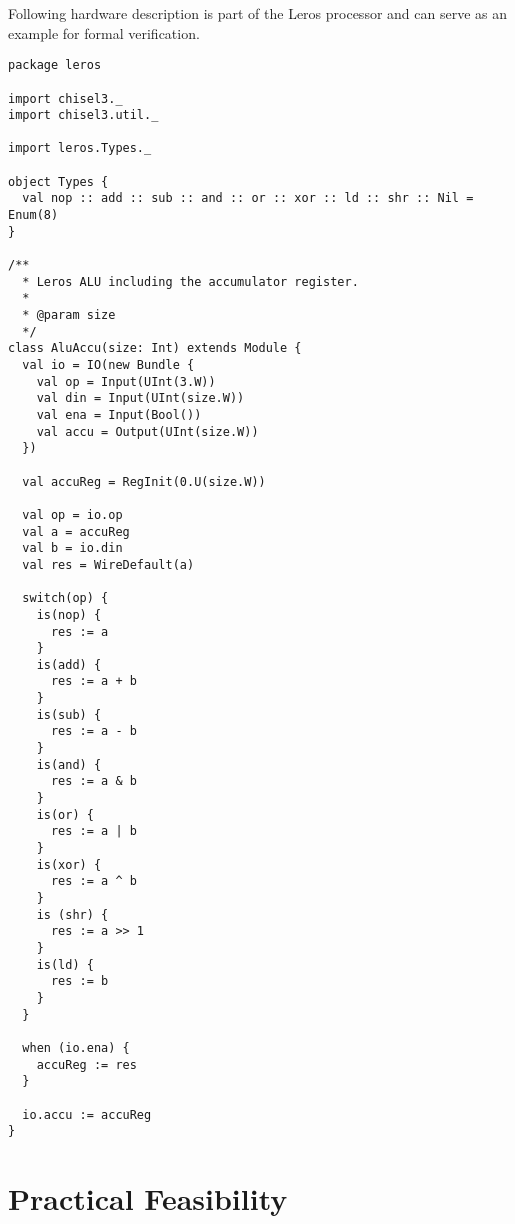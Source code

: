 \documentclass[fleqn,12pt]{article}
\newcommand{\todo}[1]{{\it TODO: #1}}
\begin{document}
Following hardware description is part of the Leros processor and can serve as an example for formal verification.

\begin{verbatim}
package leros

import chisel3._
import chisel3.util._

import leros.Types._

object Types {
  val nop :: add :: sub :: and :: or :: xor :: ld :: shr :: Nil = Enum(8)
}

/**
  * Leros ALU including the accumulator register.
  *
  * @param size
  */
class AluAccu(size: Int) extends Module {
  val io = IO(new Bundle {
    val op = Input(UInt(3.W))
    val din = Input(UInt(size.W))
    val ena = Input(Bool())
    val accu = Output(UInt(size.W))
  })

  val accuReg = RegInit(0.U(size.W))

  val op = io.op
  val a = accuReg
  val b = io.din
  val res = WireDefault(a)

  switch(op) {
    is(nop) {
      res := a
    }
    is(add) {
      res := a + b
    }
    is(sub) {
      res := a - b
    }
    is(and) {
      res := a & b
    }
    is(or) {
      res := a | b
    }
    is(xor) {
      res := a ^ b
    }
    is (shr) {
      res := a >> 1
    }
    is(ld) {
      res := b
    }
  }

  when (io.ena) {
    accuReg := res
  }

  io.accu := accuReg
}

\end{verbatim}


\section{Practical Feasibility}


%
\end{document}

